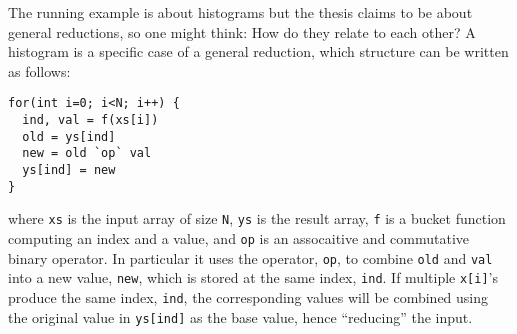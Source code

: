 The running example is about histograms but the thesis
claims to be about general reductions, so one might think:
How do they relate to each other? A histogram is a specific
case of a general reduction, which structure can be written
as follows:
%
\begin{lstlisting}
for(int i=0; i<N; i++) {
  ind, val = f(xs[i])
  old = ys[ind]
  new = old `op` val
  ys[ind] = new
}
\end{lstlisting}
%
where \texttt{xs} is the input array of size \texttt{N},
\texttt{ys} is the result array, \texttt{f} is a bucket
function computing an index and a value, and \texttt{op} is
an assocaitive and commutative binary operator. In
particular it uses the operator, \texttt{op}, to combine
\texttt{old} and \texttt{val} into a new value,
\texttt{new}, which is stored at the same index,
\texttt{ind}. If multiple \texttt{x[i]}'s produce the same
index, \texttt{ind}, the corresponding values will be
combined using the original value in \texttt{ys[ind]} as the
base value, hence ``reducing'' the input.

